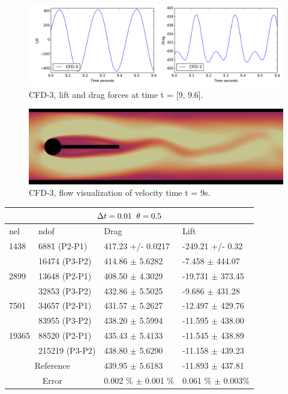 \begin{figure}[h!]
  \centering
    \includegraphics[scale=0.5]{./Fig/cfd3_liftdrag.png}
      \caption{CFD-3, lift and drag forces at time t = [9, 9.6].}
\end{figure}
\begin{figure}[h!]
  \centering
    \includegraphics[scale=0.2]{./Fig/cfd3.png}
      \caption{CFD-3, flow visualization of velocity time t = 9s.}
\end{figure}
\newpage
\begin{table}[h!]
\centering
\label{CFD-3 Results}
\begin{tabular}{ |p{1cm}||p{2.9cm}|p{3.3cm}|p{3.3cm}|}
 \hline
  \multicolumn{4}{|c|}{$\Delta t = 0.01 \hspace{2mm} \theta = 0.5$} \\
   \hline
nel & ndof & Drag  & Lift \\
\hline
 1438    & 6881  (P2-P1)   & 417.23       +/-  0.0217 & -249.21       +/-  0.32  \\
   & 16474 (P3-P2)   & 414.86      $\pm$  5.6282 & -7.458      $\pm$  444.07  \\
 \hline
 2899    & 13648  (P2-P1) & 408.50  $\pm$   4.3029 & -19.731  $\pm$   373.45 \\  
     &  32853 (P3-P2)  & 432.86      $\pm$  5.5025 & -9.686      $\pm$  431.28  \\
  \hline
  7501    & 34657 (P2-P1) & 431.57  $\pm$   5.2627 & -12.497  $\pm$   429.76 \\    
    &  83955 (P3-P2)  & 438.20      $\pm$  5.5994 & -11.595      $\pm$  438.00 \\
    \hline
    19365   & 88520 (P2-P1) & 435.43  $\pm$   5.4133 & -11.545  $\pm$   438.89 \\
   &   215219 (P3-P2) & 438.80      $\pm$  5.6290 & -11.158      $\pm$  439.23 \\
\hline
 \multicolumn{2}{|c|}{Reference}  & 439.95 $\pm$ 5.6183 & -11.893 $\pm$ 437.81\\
 \hline
  \multicolumn{2}{|c|}{Error}  & 0.002 \% $\pm$ 0.001 \% & 0.061 \% $\pm$ 0.003\% \\
  \hline
  \end{tabular}
\end{table}
